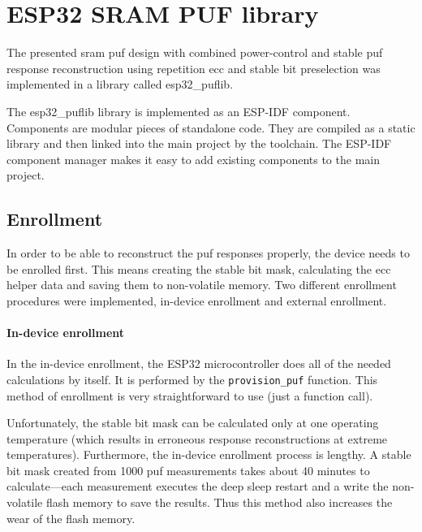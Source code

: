 \chapter{ESP32 SRAM PUF library}\label{sec:puflib}

The presented \gls{sram} \gls{puf} design with combined power-control and stable \gls{puf} response reconstruction using repetition \gls{ecc} and stable bit preselection was implemented in a library called esp32\_puflib. 

The esp32\_puflib library is implemented as an ESP-IDF component. Components are modular pieces of standalone code. They are compiled as a static library and then linked into the main project by the toolchain. The ESP-IDF component manager makes it easy to add existing components to the main project.~\cite{espidf2022}

\section{Enrollment}

In order to be able to reconstruct the \gls{puf} responses properly, the device needs to be enrolled first. This means creating the stable bit mask, calculating the \gls{ecc} helper data and saving them to non-volatile memory. Two different enrollment procedures were implemented, in-device enrollment and external enrollment.

\subsubsection*{In-device enrollment}

In the in-device enrollment, the ESP32 microcontroller does all of the needed calculations by itself. It is performed by the \lstinline{provision_puf} function. This method of enrollment is very straightforward to use (just a function call).

Unfortunately, the stable bit mask can be calculated only at one operating temperature (which results in erroneous response reconstructions at extreme temperatures). Furthermore, the in-device enrollment process is lengthy. A stable bit mask created from 1000 \gls{puf} measurements takes about 40 minutes to calculate---each measurement executes the deep sleep restart and a write the non-volatile flash memory to save the results. Thus this method also increases the wear of the flash memory.

